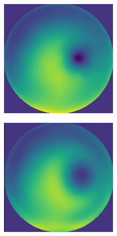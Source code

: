 \begin{figure}[h]
	\centering
	\begin{subfigure}{0.285\textwidth}
		\centering
		\includegraphics[width=1\linewidth, scale=0.5]{images/observed_wavefront.png}
		\caption{}
		\label{fig:observed_wavefront}
	\end{subfigure}
	\begin{subfigure}{0.285\textwidth}
		\centering
		\includegraphics[width=1\linewidth, scale=0.5]{images/simulated_wavefront.png}

\end{subfigure}
\end{figure}
